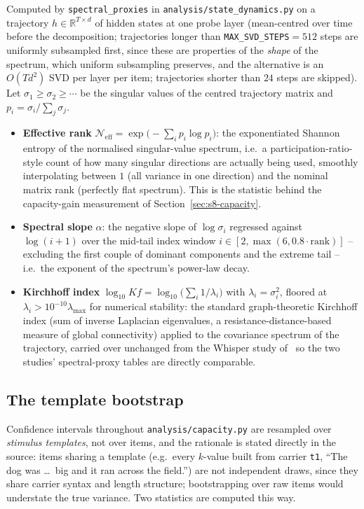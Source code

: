 \documentclass[11pt]{article}
\begin{document}
Computed by \texttt{spectral\_proxies} in \texttt{analysis/state\_dynamics.py}
on a trajectory $h \in \mathbb{R}^{T\times d}$ of hidden states at one probe
layer (mean-centred over time before the decomposition; trajectories longer
than \texttt{MAX\_SVD\_STEPS}$=512$ steps are uniformly subsampled first,
since these are properties of the \emph{shape} of the spectrum, which
uniform subsampling preserves, and the alternative is an $O(Td^2)$ SVD per
layer per item; trajectories shorter than $24$ steps are skipped). Let
$\sigma_1\ge\sigma_2\ge\cdots$ be the singular values of the centred
trajectory matrix and $p_i = \sigma_i/\sum_j\sigma_j$.

\begin{itemize}
\item \textbf{Effective rank} $\mathcal{N}_{\mathrm{eff}} =
  \exp\!\big(-\sum_i p_i\log p_i\big)$: the exponentiated Shannon entropy of
  the normalised singular-value spectrum, i.e.\ a participation-ratio-style
  count of how many singular directions are actually being used, smoothly
  interpolating between $1$ (all variance in one direction) and the nominal
  matrix rank (perfectly flat spectrum). This is the statistic behind the
  capacity-gain measurement of Section~\ref{sec:s8-capacity}.
\item \textbf{Spectral slope} $\alpha$: the negative slope of $\log\sigma_i$
  regressed against $\log(i+1)$ over the mid-tail index window
  $i \in [2, \max(6, 0.8\cdot\text{rank})]$ -- excluding the first couple of
  dominant components and the extreme tail -- i.e.\ the exponent of the
  spectrum's power-law decay.
\item \textbf{Kirchhoff index} $\log_{10} Kf = \log_{10}\!\big(\sum_i
  1/\lambda_i\big)$ with $\lambda_i=\sigma_i^2$, floored at
  $\lambda_i > 10^{-10}\lambda_{\max}$ for numerical stability: the standard
  graph-theoretic Kirchhoff index (sum of inverse Laplacian eigenvalues, a
  resistance-distance-based measure of global connectivity) applied to the
  covariance spectrum of the trajectory, carried over unchanged from the
  Whisper study of~\cite{viakhirev2026dispersion} so the two studies'
  spectral-proxy tables are directly comparable.
\end{itemize}

\subsection{The template bootstrap}

Confidence intervals throughout \texttt{analysis/capacity.py} are resampled
over \emph{stimulus templates}, not over items, and the rationale is stated
directly in the source: items sharing a template (e.g.\ every $k$-value built
from carrier \texttt{t1}, ``The dog was \dots\ big and it ran across the
field.'') are not independent draws, since they share carrier syntax and
length structure; bootstrapping over raw items would understate the true
variance. Two statistics are computed this way.
\end{document}
